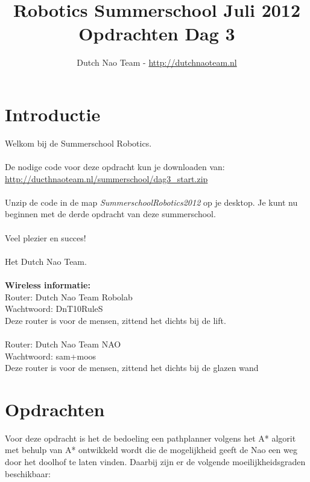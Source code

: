 \documentclass[a4paper]{article}
\title{\textbf{Robotics Summerschool Juli 2012} \\ Opdrachten Dag 3}
\author{Dutch Nao Team - \url{http://dutchnaoteam.nl}}
\date{}
\begin{document}
\maketitle

\section{Introductie}
Welkom bij de Summerschool Robotics.\\
\\
De nodige code voor deze opdracht kun je downloaden van:\\ \url{http://ducthnaoteam.nl/summerschool/dag3\_start.zip}\\
\\
Unzip de code in de map \textit{SummerschoolRobotics2012} op je desktop. Je kunt nu beginnen met de derde opdracht van deze summerschool. \\
\\
Veel plezier en succes!\\
\\
Het Dutch Nao Team.\\
\\
\textbf{Wireless informatie:}\\
Router:  Dutch Nao Team Robolab\\
Wachtwoord: DnT10RuleS\\
Deze router is voor de mensen, zittend het dichts bij de lift.\\
\\
Router:  Dutch Nao Team NAO\\
Wachtwoord: sam+moos\\
Deze router is voor de mensen, zittend het dichts bij de glazen wand


\tableofcontents

\newpage


\section{Opdrachten}
Voor deze opdracht is het de bedoeling een pathplanner volgens het A* algorit met behulp van A* ontwikkeld wordt die de mogelijkheid geeft de Nao een weg door het doolhof te laten vinden. Daarbij zijn er de volgende moeilijkheidsgraden beschikbaar:
\end{document}
